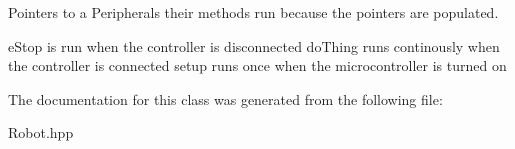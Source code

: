 Pointers to a Peripherals their methods run because the pointers are populated. 

e\+Stop is run when the controller is disconnected do\+Thing runs continously when the controller is connected setup runs once when the microcontroller is turned on 

The documentation for this class was generated from the following file\+:\begin{DoxyCompactItemize}
\item 
Robot.\+hpp\end{DoxyCompactItemize}
